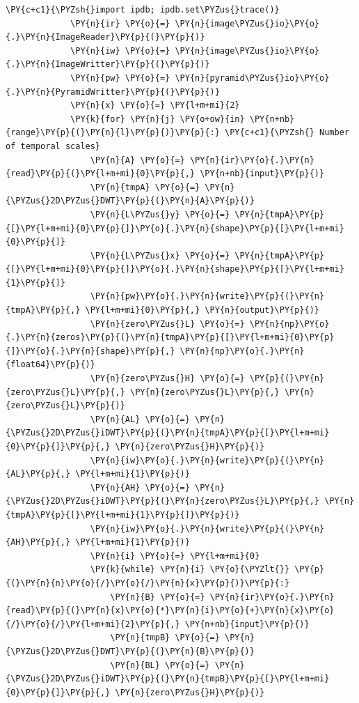 \begin{Verbatim}[commandchars=\\\{\}]
             \PY{c+c1}{\PYZsh{}import ipdb; ipdb.set\PYZus{}trace()}
             \PY{n}{ir} \PY{o}{=} \PY{n}{image\PYZus{}io}\PY{o}{.}\PY{n}{ImageReader}\PY{p}{(}\PY{p}{)}
             \PY{n}{iw} \PY{o}{=} \PY{n}{image\PYZus{}io}\PY{o}{.}\PY{n}{ImageWritter}\PY{p}{(}\PY{p}{)}
             \PY{n}{pw} \PY{o}{=} \PY{n}{pyramid\PYZus{}io}\PY{o}{.}\PY{n}{PyramidWritter}\PY{p}{(}\PY{p}{)}
             \PY{n}{x} \PY{o}{=} \PY{l+m+mi}{2}
             \PY{k}{for} \PY{n}{j} \PY{o+ow}{in} \PY{n+nb}{range}\PY{p}{(}\PY{n}{l}\PY{p}{)}\PY{p}{:} \PY{c+c1}{\PYZsh{} Number of temporal scales}
                 \PY{n}{A} \PY{o}{=} \PY{n}{ir}\PY{o}{.}\PY{n}{read}\PY{p}{(}\PY{l+m+mi}{0}\PY{p}{,} \PY{n+nb}{input}\PY{p}{)}
                 \PY{n}{tmpA} \PY{o}{=} \PY{n}{\PYZus{}2D\PYZus{}DWT}\PY{p}{(}\PY{n}{A}\PY{p}{)}
                 \PY{n}{L\PYZus{}y} \PY{o}{=} \PY{n}{tmpA}\PY{p}{[}\PY{l+m+mi}{0}\PY{p}{]}\PY{o}{.}\PY{n}{shape}\PY{p}{[}\PY{l+m+mi}{0}\PY{p}{]}
                 \PY{n}{L\PYZus{}x} \PY{o}{=} \PY{n}{tmpA}\PY{p}{[}\PY{l+m+mi}{0}\PY{p}{]}\PY{o}{.}\PY{n}{shape}\PY{p}{[}\PY{l+m+mi}{1}\PY{p}{]}
                 \PY{n}{pw}\PY{o}{.}\PY{n}{write}\PY{p}{(}\PY{n}{tmpA}\PY{p}{,} \PY{l+m+mi}{0}\PY{p}{,} \PY{n}{output}\PY{p}{)}        
                 \PY{n}{zero\PYZus{}L} \PY{o}{=} \PY{n}{np}\PY{o}{.}\PY{n}{zeros}\PY{p}{(}\PY{n}{tmpA}\PY{p}{[}\PY{l+m+mi}{0}\PY{p}{]}\PY{o}{.}\PY{n}{shape}\PY{p}{,} \PY{n}{np}\PY{o}{.}\PY{n}{float64}\PY{p}{)}
                 \PY{n}{zero\PYZus{}H} \PY{o}{=} \PY{p}{(}\PY{n}{zero\PYZus{}L}\PY{p}{,} \PY{n}{zero\PYZus{}L}\PY{p}{,} \PY{n}{zero\PYZus{}L}\PY{p}{)}
                 \PY{n}{AL} \PY{o}{=} \PY{n}{\PYZus{}2D\PYZus{}iDWT}\PY{p}{(}\PY{n}{tmpA}\PY{p}{[}\PY{l+m+mi}{0}\PY{p}{]}\PY{p}{,} \PY{n}{zero\PYZus{}H}\PY{p}{)}
                 \PY{n}{iw}\PY{o}{.}\PY{n}{write}\PY{p}{(}\PY{n}{AL}\PY{p}{,} \PY{l+m+mi}{1}\PY{p}{)}
                 \PY{n}{AH} \PY{o}{=} \PY{n}{\PYZus{}2D\PYZus{}iDWT}\PY{p}{(}\PY{n}{zero\PYZus{}L}\PY{p}{,} \PY{n}{tmpA}\PY{p}{[}\PY{l+m+mi}{1}\PY{p}{]}\PY{p}{)}
                 \PY{n}{iw}\PY{o}{.}\PY{n}{write}\PY{p}{(}\PY{n}{AH}\PY{p}{,} \PY{l+m+mi}{1}\PY{p}{)}
                 \PY{n}{i} \PY{o}{=} \PY{l+m+mi}{0}
                 \PY{k}{while} \PY{n}{i} \PY{o}{\PYZlt{}} \PY{p}{(}\PY{n}{n}\PY{o}{/}\PY{o}{/}\PY{n}{x}\PY{p}{)}\PY{p}{:}
                     \PY{n}{B} \PY{o}{=} \PY{n}{ir}\PY{o}{.}\PY{n}{read}\PY{p}{(}\PY{n}{x}\PY{o}{*}\PY{n}{i}\PY{o}{+}\PY{n}{x}\PY{o}{/}\PY{o}{/}\PY{l+m+mi}{2}\PY{p}{,} \PY{n+nb}{input}\PY{p}{)}
                     \PY{n}{tmpB} \PY{o}{=} \PY{n}{\PYZus{}2D\PYZus{}DWT}\PY{p}{(}\PY{n}{B}\PY{p}{)}
                     \PY{n}{BL} \PY{o}{=} \PY{n}{\PYZus{}2D\PYZus{}iDWT}\PY{p}{(}\PY{n}{tmpB}\PY{p}{[}\PY{l+m+mi}{0}\PY{p}{]}\PY{p}{,} \PY{n}{zero\PYZus{}H}\PY{p}{)}

\end{Verbatim}
